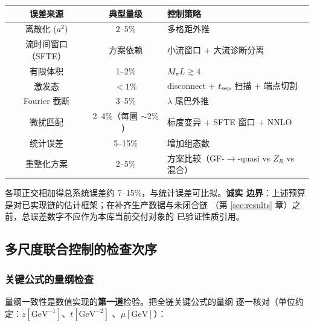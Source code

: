 \documentclass[11pt,a4paper]{ctexart}
\begin{document}
\begin{center}
\begin{tabular}{c c l}
\toprule
\textbf{误差来源} & \textbf{典型量级} & \textbf{控制策略} \\
\midrule
离散化 ($a^2$) & 2--5\% & 多格距外推 \\
流时间窗口（SFTE） & 方案依赖 & 小流窗口 + 大流诊断分离 \\
有限体积 & 1--2\% & $M_\pi L\gtrsim4$ \\
激发态 & $<1\%$ & disconnect + $t_{\rm sep}$ 扫描 + 端点切割 \\
Fourier 截断 & 3--5\% & $\lambda$ 尾巴外推 \\
微扰匹配 & 2--4\%（每圈 $\sim2\%$） & 标度变异 + SFTE 窗口 + NNLO \\
统计误差 & 5--15\% & 增加组态数 \\
重整化方案 & 2--5\% & 方案比较（GF-$\to$-quasi vs $Z_R$ vs 混合） \\
\bottomrule
\end{tabular}
\end{center}
各项正交相加得总系统误差约 7--15\%，与统计误差可比拟。\textbf{诚实
边界}：上述预算是对已实现链的估计框架；在补齐生产数据与未闭合链
（第 \ref{sec:results} 章）之前，总误差数字不应作为本库当前交付对象的
已验证性质引用。

\subsection{多尺度联合控制的检查次序}

\subsubsection{关键公式的量纲检查}

量纲一致性是数值实现的\textbf{第一道}检验。把全链关键公式的量纲
逐一核对（单位约定：$z[\mathrm{GeV}^{-1}]$、$t[\mathrm{GeV}^{-2}]$
、$\mu[\mathrm{GeV}]$）：
\end{document}
